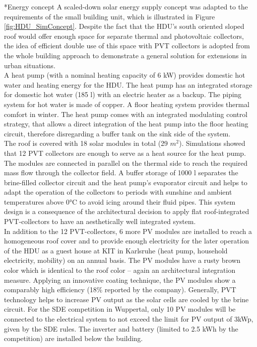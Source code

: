 \documentclass[twocolumn, a4paper,10pt]{article}
\makeatletter
\renewcommand\subsection{\@startsection{subsection}{1}{\z@}{\z@}{\z@}{\normalfont\normalsize\bfseries}}
\renewcommand\subsection{\@startsection{subsection}{1}{\z@}{\z@}{0.1pt}{\normalfont\normalsize\bfseries}}
\makeatother
\begin{document}
\subsection*{Energy concept}
A scaled-down solar energy supply concept was adapted to the requirements of the small building unit, which is illustrated in Figure \ref{fig:HDU_SimConcept}. Despite the fact that the HDU's south oriented sloped roof would offer enough space for separate thermal and photovoltaic collectors, the idea of efficient double use of this space with PVT collectors is adopted from the whole building approach to demonstrate a general solution for extensions in urban situations.\\ 
A heat pump (with a nominal heating capacity of 6 kW) provides domestic hot water and heating energy for the HDU. The heat pump has an integrated storage for domestic hot water (185 l) with an electric heater as a backup. The piping system for hot water is made of copper. A floor heating system provides thermal comfort in winter. The heat pump comes with an integrated modulating control strategy, that allows a direct integration of the heat pump into the floor heating circuit, therefore disregarding a buffer tank on the sink side of the system.\\
The roof is covered with 18 solar modules in total (29 $m^2$). Simulations showed that 12 PVT collectors are enough to serve as a heat source for the heat pump. The modules are connected in parallel on the thermal side to reach the required mass flow through the collector field. A buffer storage of 1000 l separates the brine-filled collector circuit and the heat pump's evaporator circuit and helps to adapt the operation of the collectors to periods with sunshine and ambient temperatures above 0°C to avoid icing around their fluid pipes. This system design is a consequence of the architectural decision to apply flat roof-integrated PVT-collectors to have an aesthetically well integrated system. \\
In addition to the 12 PVT-collectors, 6 more PV modules are installed to reach a homogeneous roof cover and to provide enough electricity for the later operation of the HDU as a guest house at KIT in Karlsruhe (heat pump, household electricity, mobility) on an annual basis. The PV modules have a rusty brown color which is identical to the roof color – again an architectural integration measure. Applying an innovative coating technique, the PV modules show a comparably high efficiency (18\% reported by the company). Generally, PVT technology helps to increase PV output as the solar cells are cooled by the brine circuit. For the SDE competition in Wuppertal, only 10 PV modules will be connected to the electrical system to not exceed the limit for PV output of 3kWp, given by the SDE rules. The inverter and battery (limited to 2.5 kWh by the competition) are installed below the building. \\
\end{document}
